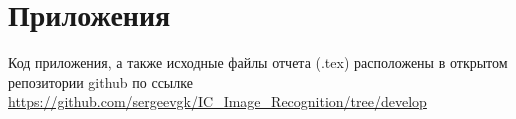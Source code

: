 \section{Приложения}
Код приложения, а также исходные файлы отчета (.tex) расположены в открытом репозитории github по ссылке \\
\href{https://github.com/sergeevgk/IC_Image_Recognition/tree/develop}{https://github.com/sergeevgk/IC\_Image\_Recognition/tree/develop}
\protect